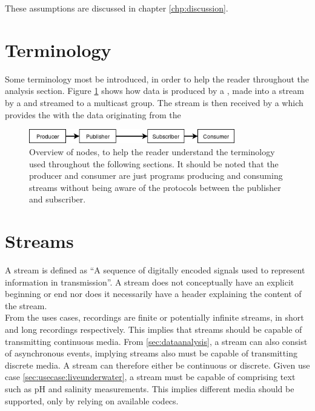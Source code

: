 These assumptions are discussed in chapter \ref{chp:discussion}. 

\section{Terminology} \label{sec:analysis:terminology}
Some terminology most be introduced, in order to help the reader throughout the analysis section. Figure \ref{fig:analysis:terminology} shows how data is produced by a , made into a stream by a  and streamed to a multicast group. The stream is then received by a  which provides the  with the data  originating from the 

\begin{figure}[h!]
	\centering
	\includegraphics[width=0.8\textwidth]{figures/analysis-terminilogy-overview.png}
	\caption{Overview of nodes, to help the reader understand the terminology used throughout the following sections. It should be noted that the producer and consumer are just programs producing and consuming streams without being aware of the protocols between the publisher and subscriber.} \label{fig:analysis:terminology}
\end{figure}


\section{Streams} \label{sec:analysis:streams}
A stream is defined as ``A sequence of digitally encoded signals used to represent information in transmission''\citep{data_stream_2018}. A stream does not conceptually have an explicit beginning or end nor does it necessarily have a header explaining the content of the stream.\\
From the uses cases, recordings are finite or potentially infinite streams, in short and long recordings respectively. This implies that streams should be capable of transmitting   continuous media. From \ref{sec:dataanalysis}, a stream can also consist of asynchronous events, implying streams also must be capable of transmitting discrete media. 
A stream can therefore either be continuous or discrete. 
Given use case \ref{sec:usecase:liveunderwater}, a stream must be capable of comprising text such as pH and salinity measurements. This implies different media should be supported, only by relying on available codecs. 

